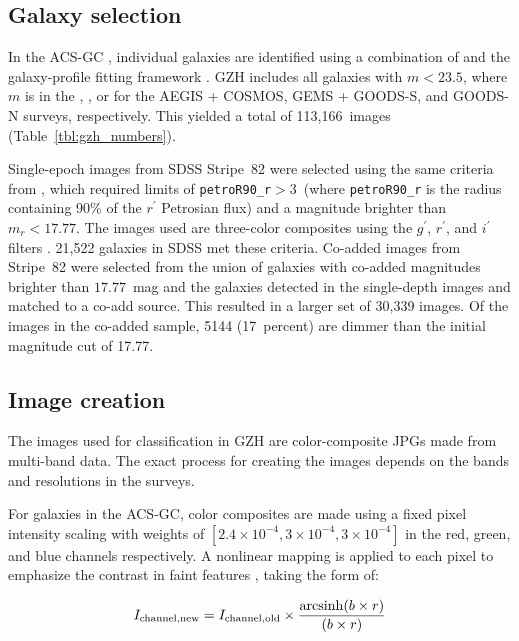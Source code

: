 \documentclass[twocolumn]{aastex6}
\begin{document}
\subsection{Galaxy selection}

In the ACS-GC \citep{gri12}, individual galaxies are identified using a combination of \sextractor{} \citep{ber96} and the galaxy-profile fitting framework \galapagos{} \citep{bar12}. GZH includes all galaxies with $m < 23.5$, where $m$ is in the \Iband, \zband, or \iband{} for the AEGIS + COSMOS, GEMS + GOODS-S, and GOODS-N surveys, respectively. This yielded a total of 113,166~images (Table~\ref{tbl:gzh_numbers}).

Single-epoch images from SDSS Stripe~82 were selected using the same criteria from \citet{wil13}, which required limits of \texttt{petroR90\_r}$ > 3$\arcsec~(where \texttt{petroR90\_r} is the radius containing 90\% of the $r^\prime$ Petrosian flux) and a magnitude brighter than $m_r < 17.77$. The images used are three-color composites using the $g^\prime$, $r^\prime$, and $i^\prime$ filters \citep{nie04}. 21,522 galaxies in SDSS met these criteria. Co-added images from Stripe~82 were selected from the union of galaxies with co-added magnitudes brighter than $17.77$~mag and the galaxies detected in the single-depth images and matched to a co-add source. This resulted in a larger set of 30,339 images. Of the images in the co-added sample, 5144 (17~percent) are dimmer than the initial magnitude cut of 17.77. 

\subsection{Image creation}

The images used for classification in GZH are color-composite JPGs made from multi-band data. The exact process for creating the images depends on the bands and resolutions in the surveys. 

For galaxies in the ACS-GC, color composites are made using a fixed pixel intensity scaling with weights of $[2.4\times10^{-4},3\times10^{-4},3\times10^{-4}]$ in the red, green, and blue channels respectively. A nonlinear mapping is applied to each pixel to emphasize the contrast in faint features \citep{lup04}, taking the form of:

\begin{equation}
I_\mathrm{channel,new} = I_\mathrm{channel,old} \times \frac{\arcsinh(b\times r)}{(b\times r)}
\label{eqn:nonlinear}
\end{equation}
\end{document}
